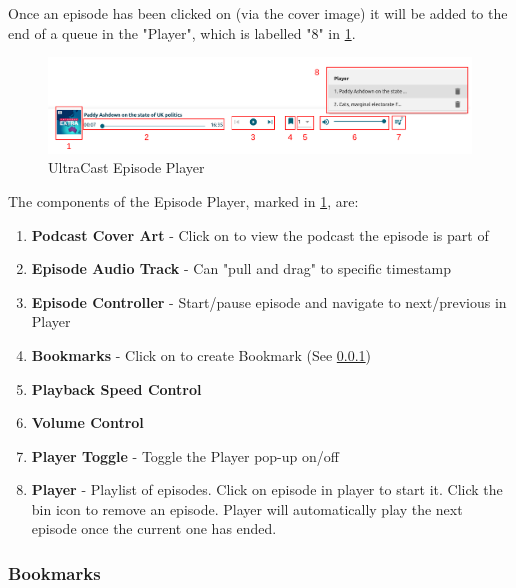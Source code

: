 \documentclass[../report.tex]{subfiles}
\begin{document}
Once an episode has been clicked on (via the cover image) it will be added to
the end of a queue in the "Player", which is labelled "8" in \cref{fig:UM_episode_player}.
%
\begin{figure}[ht]
    \centering
    \includegraphics[width=16cm]{resources/UM_Episode_Player}
    \caption{UltraCast Episode Player}
    \label{fig:UM_episode_player} 
\end{figure}
% 
The components of the Episode Player, marked in \cref{fig:UM_episode_player}, are:
\begin{enumerate}
    \item \textbf{Podcast Cover Art} - Click on to view the podcast the episode is part of
    \item \textbf{Episode Audio Track} - Can "pull and drag" to specific timestamp
    \item \textbf{Episode Controller} - Start/pause episode and navigate to next/previous in Player
    \item \textbf{Bookmarks} - Click on to create Bookmark (See \cref{sssec:UM_bookmarks})
    \item \textbf{Playback Speed Control}
    \item \textbf{Volume Control}
    \item \textbf{Player Toggle} - Toggle the Player pop-up on/off
    \item \textbf{Player} - Playlist of episodes. Click on episode in player to start it. Click the bin icon to remove an episode. Player will automatically play the next episode once the current one has ended.
\end{enumerate}

\subsubsection{Bookmarks} \label{sssec:UM_bookmarks}
\end{document}
